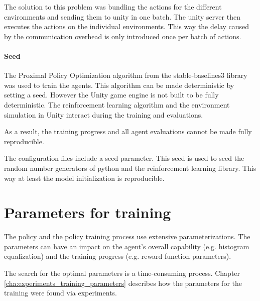 The solution to this problem was bundling the actions for the different environments and sending them to unity in one batch. The unity server then executes the actions on the individual environments. This way the delay caused by the communication overhead is only introduced once per batch of actions.

\paragraph{Seed}

The Proximal Policy Optimization algorithm from the stable-baselines3 library was used to train the agents. This algorithm can be made deterministic by setting a seed. However the Unity game engine is not built to be fully deterministic. The reinforcement learning algorithm and the environment simulation in Unity interact during the training and evaluations. 

As a result, the training progress and all agent evaluations cannot be made fully reproducible.

The configuration files include a seed parameter. This seed is used to seed the random number generators of python and the reinforcement learning library. This way at least the model initialization is reproducible.


\section{Parameters for training}

The policy and the policy training process use extensive parameterizations. The parameters can have an impact on the agent's overall capability (e.g. histogram equalization) and the training progress (e.g. reward function parameters).

The search for the optimal parameters is a time-consuming process. Chapter \ref{cha:experiments_training_parameters} describes how the parameters for the training were found via experiments.

